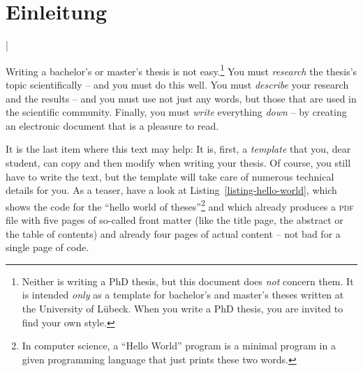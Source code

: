 \documentclass[german,version-2020-11]{uzl-thesis}
\begin{document}

%


%
%


\chapter{Einleitung}


%

\lstMakeShortInline[style=code,style=inline,language={[LaTeX]tex},moretexcs={chapter}]|

Writing a bachelor's or master's thesis is not easy.\footnote{Neither
  is writing a PhD thesis, but this document does \emph{not} concern
  them. It is intended \emph{only} as a template for bachelor's and
  master's theses written at the University of Lübeck. When you write
  a PhD thesis, you are invited to find your own style.} You must
\emph{research} the thesis's topic scientifically 
-- and you must do 
this well. You must \emph{describe} your research and the results --
and you must use not just any words, but those that are used in the
scientific community. Finally, you must \emph{write} everything
\emph{down} -- by creating an electronic document that is a pleasure
to read.

It is the last item where this text may help: It is, first, a
\emph{template} that you, dear student, can copy and then modify when
writing your thesis. Of course, you still have to write the text, but
the template will take care of numerous technical details for you. As
a teaser, have a look at Listing~\vref{listing-hello-world}, which 
shows the code for the ``hello world of theses''\footnote{In computer
  science, a ``Hello World'' program is a minimal program in a given
  programming language that   just prints these two words.} and which
already produces a \textsc{pdf} file with five pages of so-called front
matter (like the title page, the abstract or the table of contents)
and already four pages of actual content -- not bad for a single page
of code.
\end{document}
